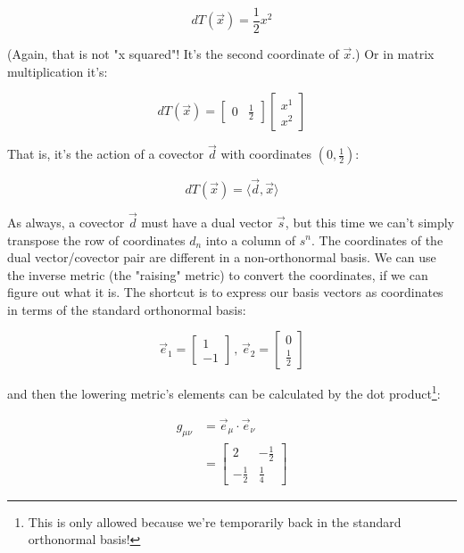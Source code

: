 \begin{equation}
    dT(\vec{x}) = \frac{1}{2}x^2
    \label{eqn:t-rel-awk}
\end{equation}

(Again, that is not "x squared"! It's the second coordinate of $\vec{x}$.) Or in matrix multiplication it's:

\begin{equation}
    dT(\vec{x}) = 
    \begin{bmatrix}0 & \frac{1}{2}\end{bmatrix}
    \begin{bmatrix}x^1 \\ x^2\end{bmatrix}
    \label{eqn:t-rel-matrices-awk}
\end{equation}

That is, it's the action of a covector $\vec{d}$ with coordinates $(0, \frac{1}{2})$:

$$
dT(\vec{x}) = \langle \vec{d}, \vec{x} \rangle
$$

As always, a covector $\vec{d}$ must have a dual vector $\vec{s}$, but this time we can't simply transpose the row of coordinates $d_n$ into a column of $s^n$. The coordinates of the dual vector/covector pair are different in a non-orthonormal basis. We can use the inverse metric (the "raising" metric) to convert the coordinates, if we can figure out what it is. The shortcut is to express our basis vectors as coordinates in terms of the standard orthonormal basis:

$$
\vec{e}_1 = \begin{bmatrix}
    1 \\
    -1
\end{bmatrix}
\, , \,
\vec{e}_2 = \begin{bmatrix}
    0 \\
    \frac{1}{2}
\end{bmatrix}
$$

and then the lowering metric's elements can be calculated by the dot product\footnote{This is only allowed because we're temporarily back in the standard orthonormal basis!}:

\begin{equation}
\begin{split}
    g_{\mu\nu} &= \vec{e}_{\mu} \cdot \vec{e}_{\nu} \\
    &= \begin{bmatrix}
        2 & -\frac{1}{2} \\
        -\frac{1}{2} & \frac{1}{4}
        \end{bmatrix}
\end{split}
\end{equation}

